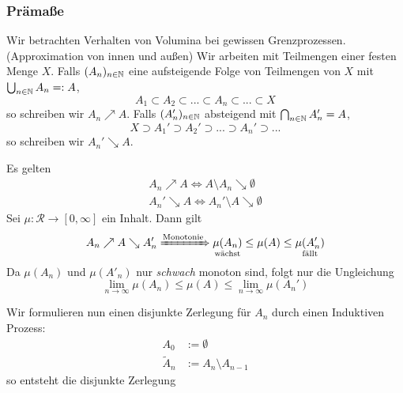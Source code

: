 \subsubsection{Prämaße}
Wir betrachten Verhalten von Volumina bei gewissen Grenzprozessen. (Approximation von innen und außen) Wir arbeiten mit Teilmengen einer festen Menge $X$.\newline \newline
Falls $(A_n)_{n \in \mathbb{N}}$ eine aufsteigende Folge von Teilmengen von $X$ mit $\bigcup_{n \in \mathbb{N}} A_n =:A$,
\begin{equation*}
A_1 \subset A_2 \subset ... \subset A_n \subset ... \subset X
\end{equation*}  so schreiben wir $A_n \nearrow A$. \newline \newline
Falls $(A'_n)_{n \in \mathbb{N}}$ absteigend mit $\bigcap_{n \in \mathbb{N}} A'_n = A$, 
\begin{equation*}
X \supset A_1' \supset A_2' \supset ... \supset A_n' \supset ...
\end{equation*}
so schreiben wir $A_n' \searrow A$.
\begin{beobachtung}
Es gelten
\begin{align*}
	A_n \nearrow A \iff A \setminus A_n \searrow \emptyset	\\
	A_n' \searrow A \iff A_n'	\setminus A \searrow \emptyset
\end{align*}
Sei $\mu: \mathcal{R} \longrightarrow [0,\infty]$ ein Inhalt. Dann gilt
\begin{equation*}
A_n \nearrow A \searrow A_n' \xRightarrow[]{\text{Monotonie}} \underset{\text{wächst}}{\mu(A_n)} \leq \mu(A) \leq \underset{\text{fällt}}{\mu(A_n')}
\end{equation*}
Da $\mu(A_n)$ und $\mu(A'_n)$ nur \emph{schwach} monoton sind, folgt nur die Ungleichung
\begin{equation}	\label{I33}
\lim\limits_{n\to\infty} \mu(A_n) \leq \mu(A) \leq \lim\limits_{n \to \infty} \mu (A_n')
\end{equation}
\end{beobachtung}
Wir formulieren nun einen disjunkte Zerlegung für $A_n$ durch einen Induktiven Prozess:
\begin{equation*}\begin{split}
	A_0 & := \emptyset	\\
	\widetilde{A}_n &:= A_n \setminus A_{n-1}	 \end{split}
\end{equation*}
so entsteht die disjunkte Zerlegung
